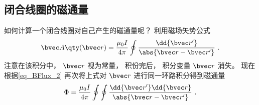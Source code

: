 \subsection{闭合线圈的磁通量}

如何计算一个闭合线圈对自己产生的磁通量呢？ 利用磁场矢势公式
\begin{equation}
\bvec A \qty(\bvec r) = \frac{\mu_0 I}{4 \pi} \oint \frac{\dd{\bvec r'}}{\abs{\bvec r - \bvec r'}}~.
\end{equation}
注意在该积分中， $\bvec r$ 视为常量， 积份完后， 积分变量 $\bvec r$ 消失。 现在根据\autoref{eq_BFlux_2} 再次将上式对 $\bvec r$ 进行同一环路积分得到磁通量
\begin{equation}
\Phi  = \frac{\mu_0 I}{4\pi} \oint\oint \frac{\dd{\bvec r'} \dd{\bvec r}}{\abs{\bvec r - \bvec r'}}~.
\end{equation}
